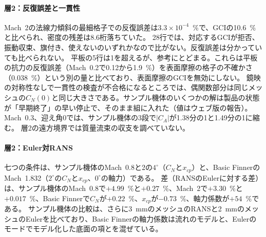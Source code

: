 \documentclass[twocolumn]{labreport}
\begin{document}
\paragraph{層2：反復誤差と一貫性}
Mach~2の法線力傾斜の最細格子での反復誤差は$3.3\times10^{-4}$~\%で、GCIの10.6~\%と比べられ、密度の残差は8.6桁落ちていた。
28行では、対応するGCIが拒否、振動収束、旗付き、使えないのいずれかなので比がない。反復誤差は分かっていても比べられない。
平板の5行は1を超えるが、参考にとどまる。これらは平板の抗力の反復誤差（Mach~0.2で0.12から1.9~\%）を表面摩擦の格子の不確かさ（0.038~\%）という別の量と比べており、表面摩擦のGCIを無効にしない。
鏡映の対称性なしで一貫性の検査が不合格になるところでは、偶関数部分は同じメッシュの$C_N(0)$と同じ大きさである。サンプル機体のいくつかの解は製品の状態が「早期終了」の早い停止で、そのまま組に入れた（値はウェブ版の報告）。
Mach~0.3、迎え角0では、サンプル機体の3段で$|C_A|$が1.38分の1と1.49分の1に縮む。
層2の遠方境界では質量流束の収支を調べていない。

\paragraph{層2：Euler対RANS}
七つの条件は、サンプル機体のMach~0.8と2の$4^\circ$（$C_N$と$x_{cp}$）と、Basic FinnerのMach~1.832（$2^\circ$の$C_N$と$x_{cp}$、$0^\circ$の軸力）である。
差（RANSのEulerに対する差）は、サンプル機体のMach~0.8で$+4.99$~\%と$+0.27$~\%、Mach~2で$+3.30$~\%と$+0.017$~\%、Basic Finnerで$C_N$が$+0.22$~\%、$x_{cp}$が$-0.73$~\%、軸力係数が$+54$~\%である。
サンプル機体の比較は、さらに3~mmのメッシュのRANSと2~mmのメッシュのEulerを比べており、Basic Finnerの軸力係数は流れのモデルと、Eulerのモードでモデル化した底面の項とを混ぜている。
\end{document}

